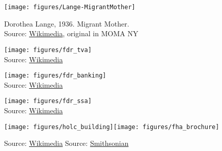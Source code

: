 \documentclass{beamer}
\begin{document}
\begin{frame}
\texttt{[image: figures/Lange-MigrantMother]}\\
\begin{footnotesize}
Dorothea Lange, 1936. Migrant Mother.\\
Source: \href{https://en.wikipedia.org/wiki/Migrant_Mother}{Wikimedia}, original in MOMA NY
\end{footnotesize}
\end{frame}

\begin{frame}
\texttt{[image: figures/fdr\_tva]}\\
Source: \href{https://commons.wikimedia.org/wiki/File:Roosevelt_signing_TVA_Act_(1933).jpg}{Wikimedia}
\end{frame}

\begin{frame}
\texttt{[image: figures/fdr\_banking]}\\
Source: \href{https://commons.wikimedia.org/wiki/File:Franklin_Delano_Roosevelt_signs_Banking_Act_of_1935.jpg}{Wikimedia}
\end{frame}

\begin{frame}
\texttt{[image: figures/fdr\_ssa]}\\
Source: \href{https://commons.wikimedia.org/wiki/File:Signing_Of_The_Social_Security_Act.jpg}{Wikimedia}
\end{frame}

\begin{frame}
\texttt{[image: figures/holc\_building]}\hfill\texttt{[image: figures/fha\_brochure]}\\
\begin{footnotesize}
Source: \href{https://commons.wikimedia.org/wiki/File:Federal_Home_Loan_Bank_Board_Building_1.jpg}{Wikimedia} \hfill Source: \href{https://sova.si.edu/details/NMAH.AC.0433\#ref10139}{Smithsonian}
\end{footnotesize}
\end{frame}
\end{document}
